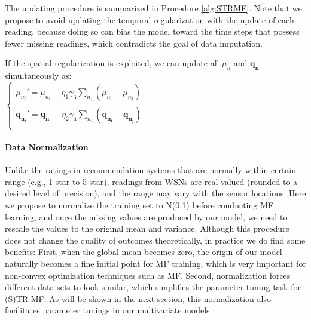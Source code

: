 The updating procedure is summarized in Procedure \ref{alg:STRMF}. Note that we propose to avoid updating the temporal regularization with the update of each reading, because doing so can bias the model toward the time steps that possess fewer missing readings, which contradicts the goal of data imputation. 

If the spatial regularization is exploited, we can update all $\mu_n$ and $\mathbf{q_n}$ simultaneously as:\\
\indent $\begin{cases}
	\mu_{n_i}' = \mu_{n_i} - \eta_1 \gamma_3 \sum_{n_j}{(\mu_{n_i} - \mu_{n_j})}\\
	\mathbf{q_{n_i}}' = \mathbf{q_{n_i}} - \eta_2 \gamma_4 \sum_{n_j}{(\mathbf{q_{n_i}} - \mathbf{q_{n_j}})}\\
	\end{cases}$\\


\paragraph*{Data Normalization}
Unlike the ratings in recommendation systems that are normally within certain range (e.g., 1 star to 5 star), readings from WSNs are real-valued (rounded to a desired level of precision), and the range may vary with the sensor locations.
Here we propose to normalize the training set to N(0,1) before conducting MF learning, and once the missing values are produced by our model, we need to rescale the values to the original mean and variance.
Although this procedure does not change the quality of outcomes theoretically, in practice we do find some benefits: 
First, when the global mean becomes zero, the origin of our model naturally becomes a fine initial point for MF training, which is very important for non-convex optimization techniques such as MF.
Second, normalization forces different data sets to look similar, which simplifies the parameter tuning task for (S)TR-MF. 
As will be shown in the next section, this normalization also facilitates parameter tunings in our multivariate models.  



